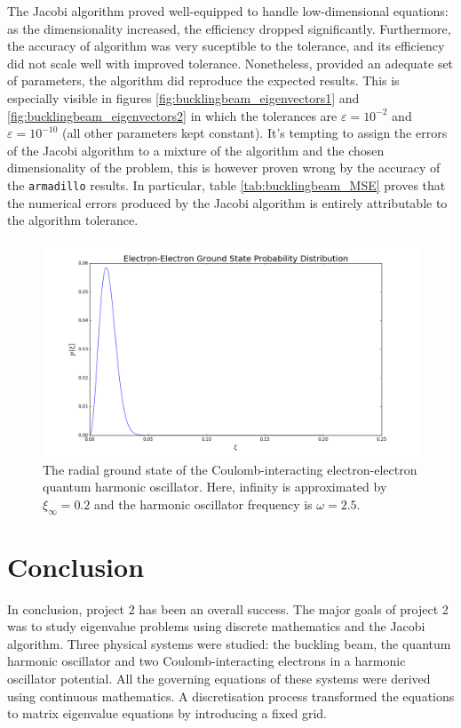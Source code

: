 \documentclass[reprint,english]{revtex4-1}
\begin{document}
The Jacobi algorithm proved well-equipped to handle low-dimensional equations: as the dimensionality increased, the efficiency dropped significantly. Furthermore, the accuracy of algorithm was very suceptible to the tolerance, and its efficiency did not scale well with 
improved tolerance. Nonetheless, provided an adequate set of parameters, the algorithm did reproduce the expected results. This is especially visible in figures \ref{fig:bucklingbeam_eigenvectors1} and \ref{fig:bucklingbeam_eigenvectors2} in which the tolerances are \(\varepsilon=10^{-2}\) and \(\varepsilon=10^{-10}\) (all other parameters kept constant). It's tempting to assign the errors of the Jacobi algorithm to a mixture of the algorithm and the chosen dimensionality of the problem, this is however proven wrong by the accuracy of the \texttt{armadillo} results. In particular, table \ref{tab:bucklingbeam_MSE} proves that the numerical errors produced by the Jacobi algorithm is entirely attributable to the algorithm tolerance.
\newpage
\begin{figure}[ht]
\centering
\includegraphics[scale=0.25]{InteractingElectrons/plots/prob200_50.png}
\caption{The radial ground state of the Coulomb-interacting electron-electron quantum harmonic oscillator. Here, infinity is approximated by \(\xi_\infty=0.2\) and the harmonic oscillator frequency is \(\omega=2.5\).}
\label{fig:interactingelectrons_eigenvectors3}
\end{figure}
\newpage
\section{Conclusion}
In conclusion, project 2 has been an overall success. The major goals of project 2 was to study eigenvalue problems using discrete mathematics and the Jacobi algorithm. Three physical systems were studied: the buckling beam, the quantum harmonic oscillator and two Coulomb-interacting electrons in a harmonic oscillator potential. All the governing equations of these systems were derived using continuous mathematics. A discretisation process transformed the equations to matrix eigenvalue equations by introducing a fixed grid. 
\end{document}
